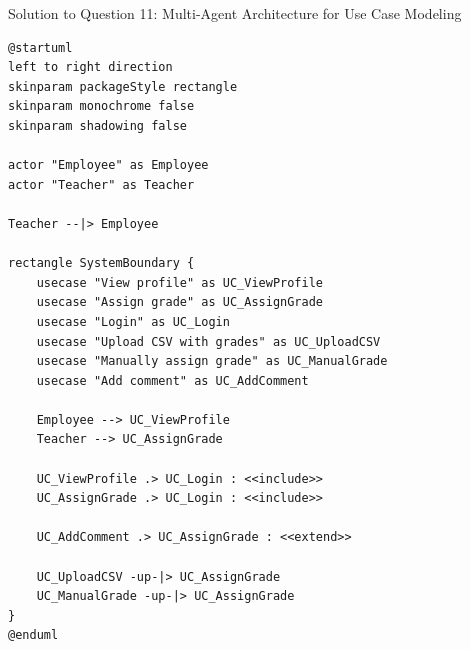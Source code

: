 \documentclass[11pt,a4paper]{article}
\begin{document}
\begin{solutionbox}{Solution to Question 11: Multi-Agent Architecture for Use Case Modeling}
\begin{lstlisting}[style=mydiff,caption={Synthesized PlantUML Output for Exam Use Case Diagram}]
@startuml
left to right direction
skinparam packageStyle rectangle
skinparam monochrome false
skinparam shadowing false

actor "Employee" as Employee
actor "Teacher" as Teacher

Teacher --|> Employee

rectangle SystemBoundary {
    usecase "View profile" as UC_ViewProfile
    usecase "Assign grade" as UC_AssignGrade
    usecase "Login" as UC_Login
    usecase "Upload CSV with grades" as UC_UploadCSV
    usecase "Manually assign grade" as UC_ManualGrade
    usecase "Add comment" as UC_AddComment
    
    Employee --> UC_ViewProfile
    Teacher --> UC_AssignGrade
    
    UC_ViewProfile .> UC_Login : <<include>>
    UC_AssignGrade .> UC_Login : <<include>>
    
    UC_AddComment .> UC_AssignGrade : <<extend>>
    
    UC_UploadCSV -up-|> UC_AssignGrade
    UC_ManualGrade -up-|> UC_AssignGrade
}
@enduml
\end{lstlisting}
\end{solutionbox}
\end{document}
